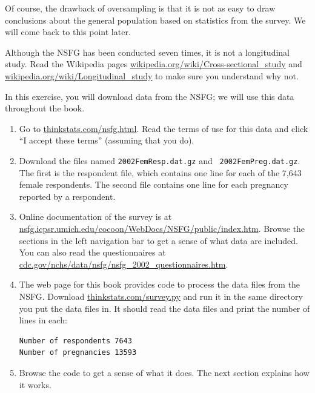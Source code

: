 \documentclass[12pt]{book}
\begin{document}

Of course, the drawback of oversampling is that it is not as easy
to draw conclusions about the general population based on statistics
from the survey.  We will come back to this point later.

\begin{ex}

Although the NSFG has been conducted seven times, it is not a
longitudinal study.  Read the Wikipedia pages
\url{wikipedia.org/wiki/Cross-sectional_study}
and
\url{wikipedia.org/wiki/Longitudinal_study}
to make sure you understand why not.

\end{ex}

\begin{ex}

In this exercise, you will download data from the NSFG; we will use
this data throughout the book.


\begin{enumerate}

\item Go to \url{thinkstats.com/nsfg.html}.  Read the terms of
use for this data and click ``I accept these terms'' (assuming that you do).

\item Download the files named {\tt 2002FemResp.dat.gz} and {\tt
  2002FemPreg.dat.gz}.  The first is the respondent file, which contains
  one line for each of the 7,643 female respondents.
  The second file contains one line for each pregnancy reported by a
  respondent.

\item Online documentation of the survey is at
  \url{nsfg.icpsr.umich.edu/cocoon/WebDocs/NSFG/public/index.htm}.
  Browse the sections in the left navigation bar to get a sense of
  what data are included.  You can also read the questionnaires
  at \url{cdc.gov/nchs/data/nsfg/nsfg_2002_questionnaires.htm}.

\item The web page for this book provides code to process the data
  files from the NSFG.  Download \url{thinkstats.com/survey.py}
  and run it in the same directory you put the data files in.  It
  should read the data files and print the number of lines in each:


\begin{verbatim}
Number of respondents 7643
Number of pregnancies 13593
\end{verbatim}

\item Browse the code to get a sense of what it does.  The next
section explains how it works.

\end{enumerate}

\end{ex}
\end{document}
